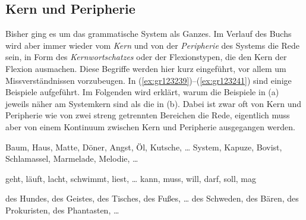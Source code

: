 \subsection{Kern und Peripherie}

\label{sec:kernundperipherie}


Bisher ging es um das grammatische System als Ganzes.
Im Verlauf des Buchs wird aber immer wieder vom \textit{Kern} und von der \textit{Peripherie} des Systems die Rede sein, \zB in Form des \textit{Kernwortschatzes} oder der Flexionstypen, die den Kern der Flexion ausmachen.
Diese Begriffe werden hier kurz eingeführt, vor allem um Missverständnissen vorzubeugen.
In (\ref{ex:gr123239})--(\ref{ex:gr123241}) sind einige Beispiele aufgeführt.
Im Folgenden wird erklärt, warum die Beispiele in (a) jeweils näher am Systemkern sind als die in (b).
Dabei ist zwar oft von Kern und Peripherie wie von zwei streng getrennten Bereichen die Rede, eigentlich muss aber von einem Kontinuum zwischen Kern und Peripherie ausgegangen werden.

\begin{exe}
  \ex\label{ex:gr123239}
  \begin{xlist}
    \ex\label{ex:gr123239a} Baum, Haus, Matte, Döner, Angst, Öl, Kutsche, \ldots
    \ex\label{ex:gr123239b} System, Kapuze, Bovist, Schlamassel, Marmelade, Melodie, \ldots
  \end{xlist}
  \ex\label{ex:gr123240}
  \begin{xlist}
    \ex\label{ex:gr123240a} geht, läuft, lacht, schwimmt, liest, \ldots
    \ex\label{ex:gr123240b} kann, muss, will, darf, soll, mag
  \end{xlist}
  \ex\label{ex:gr123241}
  \begin{xlist}
    \ex\label{ex:gr123241a} des Hundes, des Geistes, des Tisches, des Fußes, \ldots
    \ex\label{ex:gr123241b} des Schweden, des Bären, des Prokuristen, des Phantasten, \ldots
  \end{xlist}
\end{exe}


